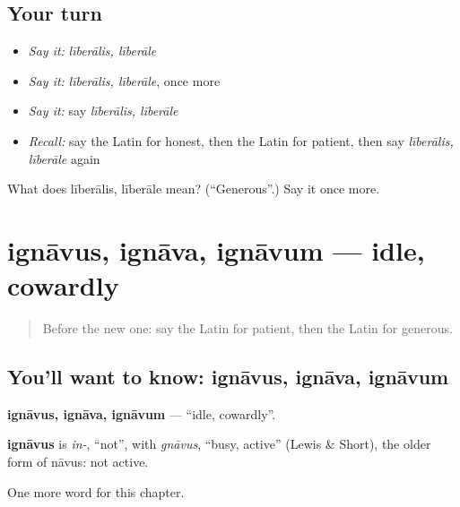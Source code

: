 \subsection*{Your turn}
\begin{itemize}
\raggedright
  \item \emph{Say it:} \emph{līberālis, līberāle}
  \item \emph{Say it:} \emph{līberālis, līberāle}, once more
  \item \emph{Say it:} say \emph{līberālis, līberāle}
  \item \emph{Recall:} say the Latin for honest, then the Latin for patient, then say \emph{līberālis, līberāle} again
\end{itemize}

\begin{tcolorbox}[breakable,colback=teal!4,colframe=teal!35!black,title={Before you move on}]
What does līberālis, līberāle mean? (\textquotedblleft{}Generous\textquotedblright{}.) Say it once more.
\end{tcolorbox}
\section[ignāvus, ignāva, ignāvum]{ignāvus, ignāva, ignāvum — idle, cowardly}

\label{lesson:LA-C213-ignavus}



\begin{quote}
Before the new one: say the Latin for patient, then the Latin for generous.
\end{quote}

\subsection*{You'll want to know: ignāvus, ignāva, ignāvum}
\textbf{ignāvus, ignāva, ignāvum} — \textquotedblleft{}idle, cowardly\textquotedblright{}.

\begin{cousinweb}
\textbf{ignāvus} is \emph{in-}, \textquotedblleft{}not\textquotedblright{}, with \emph{gnāvus}, \textquotedblleft{}busy, active\textquotedblright{} (Lewis \& Short), the older form of nāvus: not active.
\end{cousinweb}

\begin{grammarlens}[title={What you've built}]
One more word for this chapter.
\end{grammarlens}

